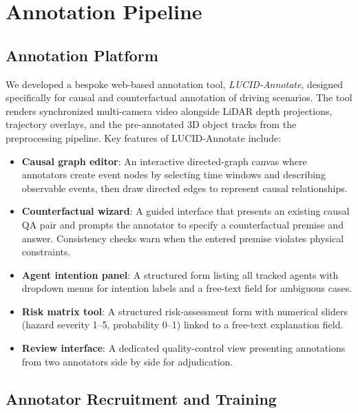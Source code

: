 \section{Annotation Pipeline}
\label{sec:annotation}

\subsection{Annotation Platform}
\label{ssec:ann_platform}

We developed a bespoke web-based annotation tool, \textit{LUCID-Annotate}, designed
specifically for causal and counterfactual annotation of driving scenarios. The tool
renders synchronized multi-camera video alongside LiDAR depth projections, trajectory
overlays, and the pre-annotated 3D object tracks from the preprocessing pipeline. Key
features of LUCID-Annotate include:

\begin{itemize}[leftmargin=2em, noitemsep]
  \item \textbf{Causal graph editor}: An interactive directed-graph canvas where annotators
        create event nodes by selecting time windows and describing observable events,
        then draw directed edges to represent causal relationships.
  \item \textbf{Counterfactual wizard}: A guided interface that presents an existing causal
        QA pair and prompts the annotator to specify a counterfactual premise and answer.
        Consistency checks warn when the entered premise violates physical constraints.
  \item \textbf{Agent intention panel}: A structured form listing all tracked agents with
        dropdown menus for intention labels and a free-text field for ambiguous cases.
  \item \textbf{Risk matrix tool}: A structured risk-assessment form with numerical sliders
        (hazard severity 1--5, probability 0--1) linked to a free-text explanation field.
  \item \textbf{Review interface}: A dedicated quality-control view presenting annotations
        from two annotators side by side for adjudication.
\end{itemize}

\subsection{Annotator Recruitment and Training}
\label{ssec:ann_recruitment}

